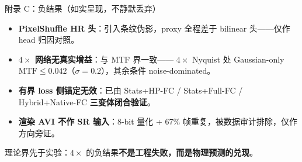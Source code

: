 \begin{frame}{附录 C：负结果（如实呈现，不静默丢弃）}
  \begin{itemize}
    \small
    \item \textbf{PixelShuffle HR 头}：引入条纹伪影，proxy 全程差于 bilinear 头——仅作 head 归因对照。
    \item \textbf{$4\times$ 网络无真实增益}：与 MTF 界一致——
          $4\times$ Nyquist 处 Gaussian-only $\mathrm{MTF}\le 0.042$（$\sigma{=}0.2$），其余条件 noise-dominated。
    \item \textbf{有界 loss 侧锚定无效}：已由 Stats+HP-FC / Stats+Full-FC / Hybrid+Native-FC \textbf{三变体闭合验证}。
    \item \textbf{渲染 AVI 不作 SR 输入}：8-bit 量化 + $67\%$ 帧重复，被数据审计排除，仅作方向旁证。
  \end{itemize}
  \begin{center}
    \footnotesize\color{darkgray!80}
    理论界先于实验：$4\times$ 的负结果\textbf{不是工程失败，而是物理预测的兑现}。
  \end{center}
\end{frame}
